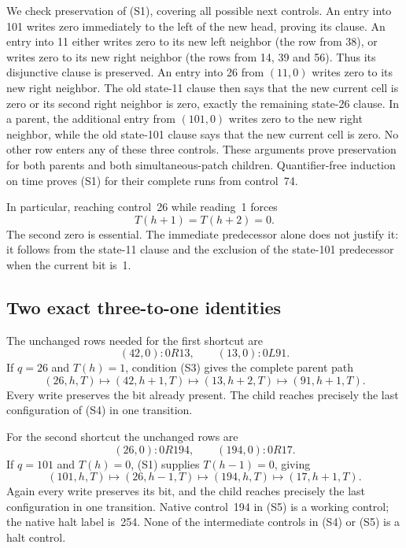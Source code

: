 We check preservation of (S1), covering all possible next controls.
An entry into 101 writes zero immediately to the left of the new head,
proving its clause.  An entry into 11 either writes zero to its new left
neighbor (the row from 38), or writes zero to its new right neighbor
(the rows from 14, 39 and 56).  Thus its disjunctive clause is preserved.
An entry into 26 from $(11,0)$ writes zero to its new right neighbor.
The old state-11 clause then says that the new current cell is zero or
its second right neighbor is zero, exactly the remaining state-26 clause.
In a parent, the additional entry from $(101,0)$ writes zero to the new
right neighbor, while the old state-101 clause says that the new current
cell is zero.  No other row enters any of these three controls.  These
arguments prove preservation for both parents and both simultaneous-patch
children.  Quantifier-free induction on time proves (S1) for their complete
runs from control~74.

In particular, reaching control~26 while reading~1 forces
\[
                  T(h+1)=T(h+2)=0.                           \tag{S3}
\]
The second zero is essential.  The immediate predecessor alone does not
justify it: it follows from the state-11 clause and the exclusion of the
state-101 predecessor when the current bit is~1.

\subsection{Two exact three-to-one identities}

The unchanged rows needed for the first shortcut are
\[
 (42,0):0R13,\qquad (13,0):0L91.
\]
If $q=26$ and $T(h)=1$, condition (S3) gives the complete parent path
\[
 (26,h,T)\longmapsto(42,h+1,T)
   \longmapsto(13,h+2,T)\longmapsto(91,h+1,T).
                                                               \tag{S4}
\]
Every write preserves the bit already present.  The child reaches precisely
the last configuration of (S4) in one transition.

For the second shortcut the unchanged rows are
\[
 (26,0):0R194,\qquad(194,0):0R17.
\]
If $q=101$ and $T(h)=0$, (S1) supplies $T(h-1)=0$, giving
\[
 (101,h,T)\longmapsto(26,h-1,T)
   \longmapsto(194,h,T)\longmapsto(17,h+1,T).
                                                               \tag{S5}
\]
Again every write preserves its bit, and the child reaches precisely the
last configuration in one transition.  Native control~194 in (S5) is a
working control; the native halt label is~254.  None of the intermediate
controls in (S4) or (S5) is a halt control.


